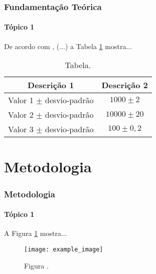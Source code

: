 \begin{frame}
    \frametitle{Fundamentação Teórica}
    \framesubtitle{Tópico 1}
    
    De acordo com , (...) a Tabela \ref{table:1} 
    mostra...
    
    \begin{table}[h!]
        \centering
        \caption{Tabela.}
        \label{table:1}
        
            \begin{tabular}[]{cc}
                
                \hline
                Descrição 1 &  Descrição 2 \\
                \hline
                \hline
                Valor 1 $\pm$ desvio-padrão & $ 1000 \pm 2 $ \\
                Valor 2 $\pm$ desvio-padrão & $ 10000 \pm 20 $\\
                Valor 3 $\pm$ desvio-padrão & $ 100 \pm 0,2 $ \\ [1ex]
                \hline
            
            \end{tabular}
    
    \end{table}
    


\end{frame}

\section{Metodologia}

\begin{frame}
    \frametitle{Metodologia}
    \framesubtitle{Tópico 1}
    
    A Figura \ref{fig:1} mostra...

    \begin{figure}
        
        \centering
        \texttt{[image: example\_image]}
        \caption{Figura \cite{article}.}
        \label{fig:1}
        
     \end{figure}

\end{frame}

